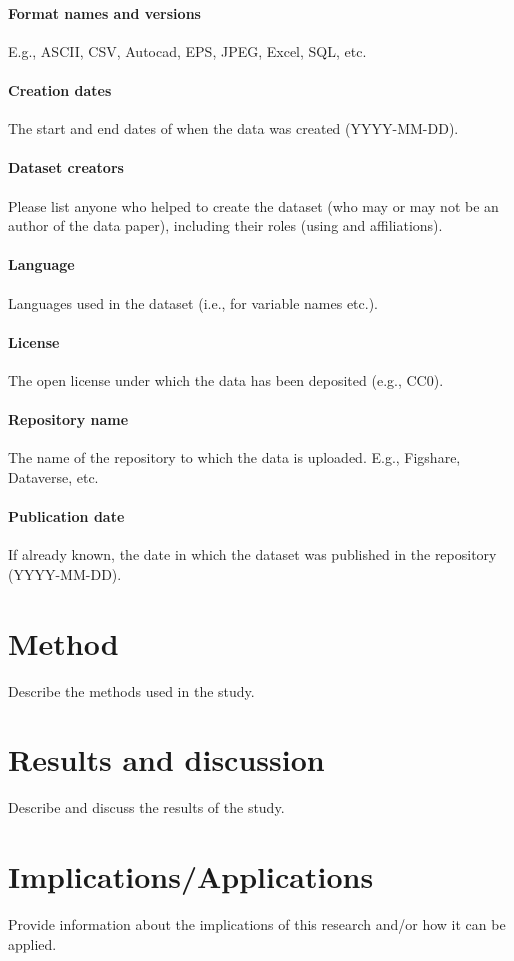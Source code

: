 \documentclass{article}
\begin{document}
\paragraph{Format names and versions} E.g., ASCII, CSV, Autocad, EPS, JPEG, Excel, SQL, etc.
\paragraph{Creation dates} The start and end dates of when the data was created (YYYY-MM-DD).
\paragraph{Dataset creators} Please list anyone who helped to create the dataset (who may or may not be an author of the data paper), including their roles (using and affiliations).
\paragraph{Language} Languages used in the dataset (i.e., for variable names etc.).
\paragraph{License} The open license under which the data has been deposited (e.g., CC0). 
\paragraph{Repository name} The name of the repository to which the data is uploaded. E.g., Figshare, Dataverse, etc. 
\paragraph{Publication date} If already known, the date in which the dataset was published in the repository (YYYY-MM-DD).

\section{Method}
Describe the methods used in the study.

\section{Results and discussion}
Describe and discuss the results of the study.

\section{Implications/Applications}
Provide information about the implications of this research and/or how it can be applied.
\end{document}

